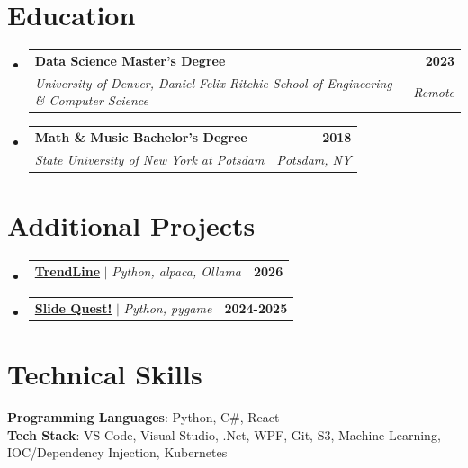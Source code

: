 \documentclass[letterpaper,11pt]{article}
\makeatletter
\newcommand{\projectDescription}[1]{
  \item\small{
    {#1 \vspace{-2pt}}
  }
}
\newcommand{\educationHeading}[4]{
  \vspace{-2pt}\item
    \begin{tabular*}{1.0\textwidth}[t]{l@{\extracolsep{\fill}}r}
      {\small\textbf{#1}} & {\small\textbf{#2}} \\
      {\small{\textsl{#3}}} & {\small{\textsl{#4}}} \\
    \end{tabular*}\vspace{-10pt}
}
\newcommand{\resumeProjectHeading}[2]{
    \item
    \begin{tabular*}{1.001\textwidth}{l@{\extracolsep{\fill}}r}
      \small#1 & \textbf{\small #2}\\
    \end{tabular*}\vspace{-6pt}
}
\newcommand{\resumeSubHeadingListStart}{\begin{itemize}[leftmargin=0.0in, label={}]}
\newcommand{\resumeSubHeadingListEnd}{\end{itemize}}
\makeatother
\begin{document}
\section{Education}
\resumeSubHeadingListStart
  \educationHeading
    {Data Science Master's Degree}{2023}
    {University of Denver, Daniel Felix Ritchie School of Engineering \& Computer Science}{Remote}
  \educationHeading
    {Math \& Music Bachelor's Degree}{2018}
    {State University of New York at Potsdam}{Potsdam, NY}
\resumeSubHeadingListEnd

\section{Additional Projects}
    \vspace{-5pt}
      \resumeSubHeadingListStart
          \resumeProjectHeading
          {\textbf{\href{https://trendline.schmidlin.casa}{TrendLine}} $|$ \emph{Python, alpaca, Ollama}}{2026}
            \vspace{-19pt}
      \resumeProjectHeading
          {\textbf{\href{https://slide-quest.schmidlin.casa}{Slide Quest!}} $|$ \emph{Python, pygame}}{2024-2025}
          \vspace{-13pt}
    \resumeSubHeadingListEnd
\vspace{-8pt}


%
\section{Technical Skills}
 \begin{itemize}[leftmargin=0.15in, label={}]
    \small{\item{
     \textbf{Programming Languages}{: Python, C\#, React} \\
     \textbf{Tech Stack}{: VS Code, Visual Studio, .Net, WPF, Git, S3, Machine Learning, IOC/Dependency Injection, Kubernetes} \\
    }}
 \end{itemize}
 \vspace{-16pt}
\end{document}
